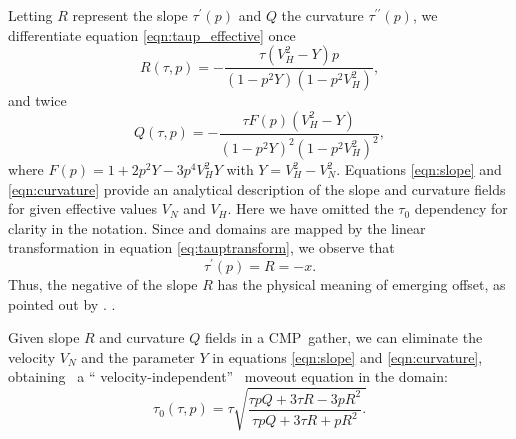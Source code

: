 Letting $R$ represent the slope $\tau ^{\prime }(p)$ and $Q$ the curvature $\tau ^{\prime \prime
}(p)$, we differentiate equation \ref{eqn:taup_effective} once
\begin{equation}
R(\tau ,p)=-\frac{{\tau (V_{H}^{2}-Y)p}}{{\left( {1-p^{2}Y}\right)
\left( {1-p^{2}V_{H}^{2}}\right) }}, \label{eqn:slope}
\end{equation}
and twice
\begin{equation}
Q(\tau ,p)=-\frac{{\tau F(p)(V_{H}^{2}-Y)}}{{\left(
{1-p^{2}Y}\right) ^{2}\left( {1-p^{2}V_{H}^{2}}\right) ^{2}}},
\label{eqn:curvature}
\end{equation}
where $F(p)=1+2p^{2}Y-3p^{4}V_{H}^{2}Y$ with $Y=V_{H}^{2}-V_{N}^{2}.$
Equations \ref{eqn:slope} and \ref{eqn:curvature} provide an
analytical description of the slope and curvature fields for given
effective values $V_{N}$ and $V_{H}$. Here we have omitted the ${\tau
_{0}}$ dependency for clarity in the notation. Since \taup and \tx
domains are mapped by the linear transformation in equation
\ref{eq:tauptransform}, we observe that
\begin{equation}
\tau ^{\prime }(p)=R=-x.  \label{eqn:emergingoffset}
\end{equation}
Thus, the negative of the slope $R$ has the physical meaning of
emerging offset, as pointed out by \cite{baan:719}.  \citep{roganov}.

Given slope $R$
and curvature $Q$ fields in a \taup CMP\ gather, we can eliminate the
velocity $V_{N}$ and the parameter $Y$ in equations \ref{eqn:slope}
and \ref{eqn:curvature},  obtaining \ a \textquotedblleft
velocity-independent\textquotedblright\ \citep{fomel:S139} moveout
equation in the \taup domain:
\begin{equation}
\tau _{0}(\tau ,p)=\tau \sqrt{\frac{{\tau pQ+3\tau R-3pR^{2}}}{{\tau
pQ+3\tau R+pR^{2}}}.}  \label{eqn:tau0mapping}
\end{equation}

